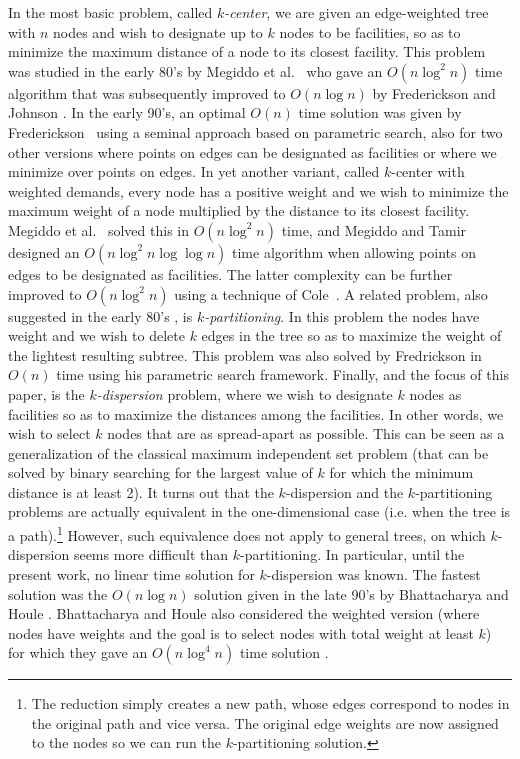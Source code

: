 \documentclass[a4paper,UKenglish]{lipics-v2016}
\theoremstyle{plain}
\newcommand{\Oh}{{O}}
\begin{document}
In the most basic problem, called \emph{$k$-center}, we are given an edge-weighted tree with $n$ nodes and wish to designate up to $k$ nodes to be facilities, so as to minimize the maximum distance of a node to its closest facility. This problem was studied in the early 80's by Megiddo et al.~\cite{Megiddo1981} who gave an $\Oh(n\log^2n)$ time algorithm that was subsequently improved to $\Oh(n\log n)$ by Frederickson and Johnson \cite{Frederickson1983}.
In the early 90's, an optimal $\Oh(n)$ time solution was given by Frederickson~\cite{Frederickson1991a,Frederickson1990} using a seminal approach based on
parametric search, also for two other versions where points on edges can be designated as facilities or where we minimize over points on edges.
In yet another variant, called $k$-center with weighted demands, every node has a positive weight and we wish to minimize the maximum weight of a node multiplied
by the distance to its closest facility. Megiddo et al.~\cite{Megiddo1981} solved this in $\Oh(n\log^{2}n)$ time, and
Megiddo and Tamir~\cite{Megiddo1983} designed an $\Oh(n\log^{2}n\log\log n)$ time algorithm when allowing points on edges to be
designated as facilities. The latter complexity can be further improved to $\Oh(n\log^{2}n)$ using a technique of Cole~\cite{Cole87}. 
%
A related problem, also suggested in the early 80's  \cite{Becker1982,Perl1981}, is \emph{$k$-partitioning}. In this problem the nodes have weight and we wish to delete $k$ edges in the tree so as to maximize the weight of the lightest resulting subtree. This problem was also solved by Fredrickson in $\Oh(n)$ time \cite{Frederickson1991} using his parametric search framework. 
%
Finally, and the focus of this paper, is the  {\em $k$-dispersion} problem, where we wish to designate $k$ nodes as facilities so as to maximize the distances among the facilities.  In other words, we wish to select $k$ nodes that are as spread-apart as possible. This can be seen as a generalization of the classical maximum independent set problem (that can be solved by binary searching for the largest value of $k$ for which the minimum distance is at least 2).  
%
It turns out that the $k$-dispersion and the $k$-partitioning problems are actually equivalent in the one-dimensional case (i.e. when the tree is a path).\footnote{The reduction simply creates a new path, whose edges correspond to nodes in the original path and vice versa. The original edge weights are now assigned to the nodes so we can run the $k$-partitioning solution.} However, such equivalence does not apply to general trees, on which $k$-dispersion seems more difficult than $k$-partitioning. In particular, until the present work, no linear time solution for $k$-dispersion was known. The fastest solution was the $O(n \log n)$ solution given in the late 90's by Bhattacharya and Houle \cite{Bhattacharya1991}. Bhattacharya and Houle also considered the weighted version (where nodes have weights and the goal is to select nodes with total weight at least $k$)  for which they gave an $\Oh(n\log^4 n)$ time solution \cite{Bhattacharya1999}.
\end{document}
